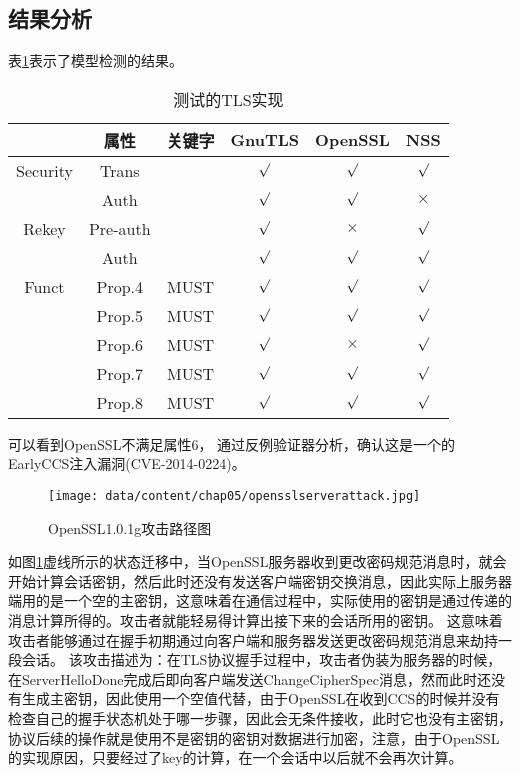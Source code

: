 \subsection{结果分析}
表\ref{table-chap04-modelcheckingresult}表示了模型检测的结果。
\begin{table}[htb]
  \centering
  \caption{测试的TLS实现}
\begin{tabular}{|c|c|c|c|c|c|}
  \hline
           & 属性 & 关键字 & GnuTLS & OpenSSL  &NSS	\\
  \hline
  Security & Trans &      &$\surd$ &$\surd$ &$\surd$	\\
  \cline{2-6}
           &Auth   &      &$\surd$ &$\surd$ &$\times$	\\
  \hline
  Rekey & Pre-auth &      &$\surd$ &$\times$ &$\surd$	\\
  \cline{2-6}
        & Auth     &      &$\surd$&$\surd$&$\surd$  \\
  \hline
Funct &Prop.4      & MUST &$\surd$&$\surd$&$\surd$	\\
  \cline{2-6}
   &Prop.5      & MUST &$\surd$&$\surd$&$\surd$	\\
  \cline{2-6}
   &Prop.6      & MUST &$\surd$&$\times$&$\surd$	\\
  \cline{2-6}
   &Prop.7      & MUST &$\surd$&$\surd$&$\surd$	\\
  \cline{2-6}
   &Prop.8      & MUST &$\surd$&$\surd$&$\surd$	\\
  \hline

\end{tabular}
\label{table-chap04-modelcheckingresult}
\end{table}
可以看到OpenSSL不满足属性6，
通过反例验证器分析，确认这是一个的EarlyCCS注入漏洞(CVE-2014-0224)。

\begin{figure}[htp]
	\centering
	\texttt{[image: data/content/chap05/opensslserverattack.jpg]}
	\caption{OpenSSL1.0.1g攻击路径图}
	\label{fig-opensslserverattack}
\end{figure}

如图\ref{fig-opensslserverattack}虚线所示的状态迁移中，当OpenSSL服务器收到更改密码规范消息时，就会开始计算会话密钥，然后此时还没有发送客户端密钥交换消息，因此实际上服务器端用的是一个空的主密钥，这意味着在通信过程中，实际使用的密钥是通过传递的消息计算所得的。攻击者就能轻易得计算出接下来的会话所用的密钥。
这意味着攻击者能够通过在握手初期通过向客户端和服务器发送更改密码规范消息来劫持一段会话。
该攻击描述为：在TLS协议握手过程中，攻击者伪装为服务器的时候，在ServerHelloDone完成后即向客户端发送ChangeCipherSpec消息，然而此时还没有生成主密钥，因此使用一个空值代替，由于OpenSSL在收到CCS的时候并没有检查自己的握手状态机处于哪一步骤，因此会无条件接收，此时它也没有主密钥，协议后续的操作就是使用不是密钥的密钥对数据进行加密，注意，由于OpenSSL的实现原因，只要经过了key的计算，在一个会话中以后就不会再次计算。


